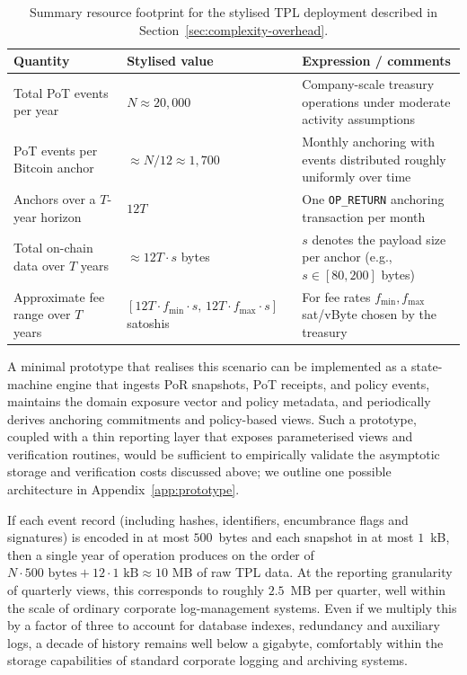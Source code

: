 \documentclass[11pt]{article}
\begin{document}
\begin{table}[H]
\centering
\scriptsize
\begin{tabularx}{\linewidth}{lXX}
\toprule
Quantity & Stylised value & Expression / comments \\
\midrule
Total PoT events per year & $N \approx 20{,}000$ & Company-scale treasury operations under moderate activity assumptions \\
PoT events per Bitcoin anchor & $\approx N/12 \approx 1{,}700$ & Monthly anchoring with events distributed roughly uniformly over time \\
Anchors over a $T$-year horizon & $12T$ & One \texttt{OP\_RETURN} anchoring transaction per month \\
Total on-chain data over $T$ years & $\approx 12T \cdot s$ bytes & $s$ denotes the payload size per anchor (e.g., $s \in [80,200]$ bytes) \\
Approximate fee range over $T$ years & $[12T \cdot f_{\min} \cdot s,\, 12T \cdot f_{\max} \cdot s]$ satoshis & For fee rates $f_{\min}, f_{\max}$ sat/vByte chosen by the treasury \\
\bottomrule
\end{tabularx}
\caption{Summary resource footprint for the stylised TPL deployment described in Section~\ref{sec:complexity-overhead}.}
\label{tab:tpl-summary}
\end{table}

A minimal prototype that realises this scenario can be implemented as a state-machine engine that ingests PoR snapshots, PoT receipts, and policy events, maintains the domain exposure vector and policy metadata, and periodically derives anchoring commitments and policy-based views.
Such a prototype, coupled with a thin reporting layer that exposes parameterised views and verification routines, would be sufficient to empirically validate the asymptotic storage and verification costs discussed above; we outline one possible architecture in Appendix~\ref{app:prototype}.

If each event record (including hashes, identifiers, encumbrance flags and signatures) is encoded in at most
$500$~bytes and each snapshot in at most $1$~kB, then a single year of operation produces on the order of
$N \cdot 500 \text{ bytes} + 12 \cdot 1\text{ kB} \approx 10 \text{ MB}$
of raw TPL data. At the reporting granularity of quarterly views, this corresponds to roughly $2.5$~MB per quarter, well within the scale of ordinary corporate log-management systems.
Even if we multiply this by a factor of three to account for database indexes, redundancy and auxiliary logs,
a decade of history remains well below a gigabyte, comfortably within the storage capabilities of standard
corporate logging and archiving systems.
\end{document}
